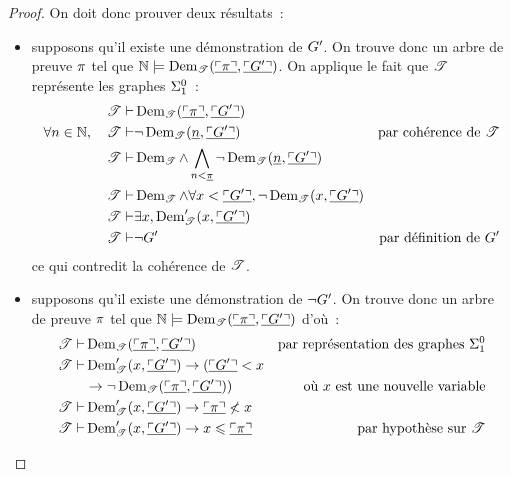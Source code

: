 \begin{proof}
  On doit donc prouver deux résultats~:
  \begin{itemize}
  \item supposons qu'il existe une démonstration de $G'$. On trouve donc
    un arbre de preuve $\pi$ tel que
    $\mathbb N\models\operatorname{Dem}_{\mathscr T}(\underline{\ulcorner\pi\urcorner},\underline{\ulcorner G'\urcorner})$.
    On applique le fait que $\mathscr T$ représente les graphes $\Sigma^0_{1}$~:
    \begin{align*}
      \mathscr T \vdash& \operatorname{Dem}_{\mathscr T}
      (\underline{\ulcorner\pi\urcorner},\underline{\ulcorner G'\urcorner}) \\
      \forall n \in \mathbb N,\quad\mathscr T
      \vdash& \lnot \operatorname{Dem}_{\mathscr T}(\underline{n}, \underline{\ulcorner G'\urcorner})
      & \text{par cohérence de }\mathscr T \\
      \mathscr T \vdash & \operatorname{Dem}_{\mathscr T} \land \bigwedge_{n < \underline{\pi}}
      \lnot\operatorname{Dem}_{\mathscr T}(\underline{n},\underline{\ulcorner G'\urcorner}) \\
      \mathscr T \vdash & \operatorname{Dem}_{\mathscr T} \land
      \forall x < \underline{\ulcorner G'\urcorner}, \lnot
      \operatorname{Dem}_{\mathscr T}(x,\underline{\ulcorner G'\urcorner}) \\
      \mathscr T \vdash & \exists x,
      \operatorname{Dem}'_{\mathscr T}(x,\underline{\ulcorner G'\urcorner}) \\
      \mathscr T \vdash & \lnot G' & \text{par définition de }G'
    \end{align*}
    ce qui contredit la cohérence de $\mathscr T$.
  \item supposons qu'il existe une démonstration de $\lnot G'$. On trouve
    donc un arbre de preuve $\pi$ tel que
    $\mathbb N \models \operatorname{Dem}_{\mathscr T}(\underline{\ulcorner\pi\urcorner},
    \underline{\ulcorner G'\urcorner})$
    d'où~:
    \begin{align*}
      \varT \vdP& \DemT{\varT}(\encode{\godcod{\varPT}},
      \encode{\godcod{\godG'}}) & \text{par représentation des graphes }
      \HierArithS 1\\
      \varT \vdP& \DemBisT{\varT}(x,\encode{\godcod{\godG'}})\to
      (\encode{\godcod{\godG'}} < x\\ & \to \lnot\DemT{\varT}
      (\encode{\godcod{\varPT}}, \encode{\godcod{\godG'}}))
      &\text{où } x \text{ est une nouvelle variable}\\
      \varT \vdP& \DemBisT{\varT}(x,\encode{\godcod{\godG'}}) \to
      \encode{\godcod{\varPT}}\nless x \\
      \varT\vdP& \DemBisT{\varT}(x, \encode{\godcod{\godG'}}) \to
      x \leq \encode{\godcod{\varPT}} & \text{par hypothèse sur } \varT

\end{align*}
\end{itemize}
\end{proof}
